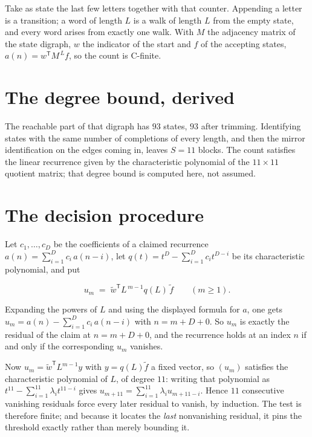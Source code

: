 \documentclass[11pt]{article}
\theoremstyle{definition}
\begin{document}
Take as state the last few letters together with that counter. Appending a letter is a transition; a word of length $L$ is a walk of length $L$ from the empty state, and every word arises from exactly one walk. With $M$ the adjacency matrix of the state digraph, $w$ the indicator of the start and $f$ of the accepting states, $a(n) = w^{\mathsf T}M^{\,L}f$, so the count is C-finite.

\section{The degree bound, derived}

The reachable part of that digraph has $93$ states, $93$ after trimming. Identifying states with the same number of completions of every length, and then the mirror identification on the edges coming in, leaves $S = 11$ blocks. The count satisfies the linear recurrence given by the characteristic polynomial of the $11\times11$ quotient matrix; that degree bound is computed here, not assumed.

\section{The decision procedure}

Let $c_1,\dots,c_D$ be the coefficients of a claimed recurrence $a(n) = \sum_{i=1}^{D} c_i\,a(n-i)$, let $q(t) = t^{D} - \sum_{i=1}^{D} c_i t^{D-i}$ be its characteristic polynomial, and put

\[u_m \;=\; \tilde w^{\mathsf T} L^{\,m-1} q(L)\,\tilde f \qquad (m \ge 1).\]

Expanding the powers of $L$ and using the displayed formula for $a$, one gets $u_m = a(n) - \sum_{i=1}^{D} c_i\,a(n-i)$ with $n = m + D + 0$. So $u_m$ is exactly the residual of the claim at $n = m + D + 0$, and the recurrence holds at an index $n$ if and only if the corresponding $u_m$ vanishes.

Now $u_m = \tilde w^{\mathsf T} L^{m-1} y$ with $y = q(L)\tilde f$ a fixed vector, so $(u_m)$ satisfies the characteristic polynomial of $L$, of degree $11$: writing that polynomial as $t^{11} - \sum_{i=1}^{11} \lambda_i t^{11-i}$ gives $u_{m+11} = \sum_{i=1}^{11} \lambda_i u_{m+11-i}$. Hence $11$ consecutive vanishing residuals force every later residual to vanish, by induction. The test is therefore finite; and because it locates the {\itshape last} nonvanishing residual, it pins the threshold exactly rather than merely bounding it.
\end{document}
